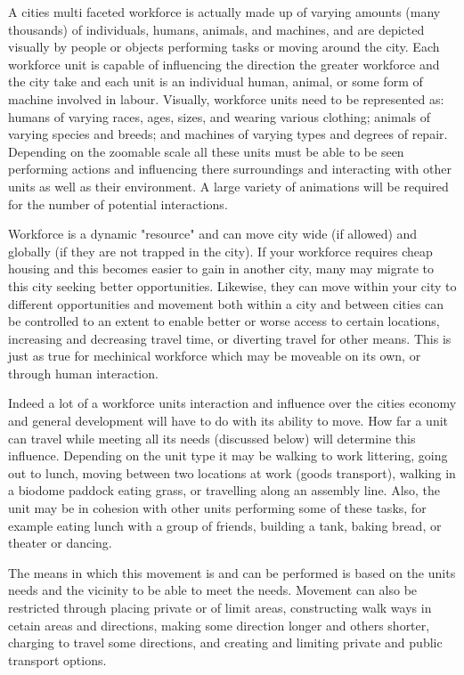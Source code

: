 A cities multi faceted workforce is actually made up of varying amounts (many thousands) of individuals, humans, animals, and machines, and are depicted visually by people or objects performing tasks or moving around the city. Each workforce unit is capable of influencing the direction the greater workforce and the city take and each unit is an individual human, animal, or some form of machine involved in labour. Visually, workforce units need to be represented as: humans of varying races, ages, sizes, and wearing various clothing; animals of varying species and breeds; and machines of varying types and degrees of repair. Depending on the zoomable scale all these units must be able to be seen performing actions and influencing there surroundings and interacting with other units as well as their environment. A large variety of animations will be required for the number of potential interactions. 

Workforce is a dynamic "resource" and can move city wide (if allowed) and globally (if they are not trapped in the city). If your workforce requires cheap housing and this becomes easier to gain in another city, many may migrate to this city seeking better opportunities. Likewise, they can move within your city to different opportunities and movement both within a city and between cities can be controlled to an extent to enable better or worse access to certain locations, increasing and decreasing travel time, or diverting travel for other means. This is just as true for mechinical workforce which may be moveable on its own, or through human interaction. 

Indeed a lot of a workforce units interaction and influence over the cities economy and general development will have to do with its ability to move. How far a unit can travel while meeting all its needs (discussed below) will determine this influence. Depending on the unit type it may be walking to work littering, going out to lunch, moving between two locations at work (goods transport), walking in a biodome paddock eating grass, or travelling along an assembly line. Also, the unit may be in cohesion with other units performing some of these tasks, for example eating lunch with a group of friends, building a tank, baking bread, or theater or dancing. 

The means in which this movement is and can be performed is based on the units needs and the vicinity to be able to meet the needs. Movement can also be restricted through placing private or of limit areas, constructing walk ways in cetain areas and directions, making some direction longer and others shorter, charging to travel some directions, and creating and limiting private and public transport options. 

